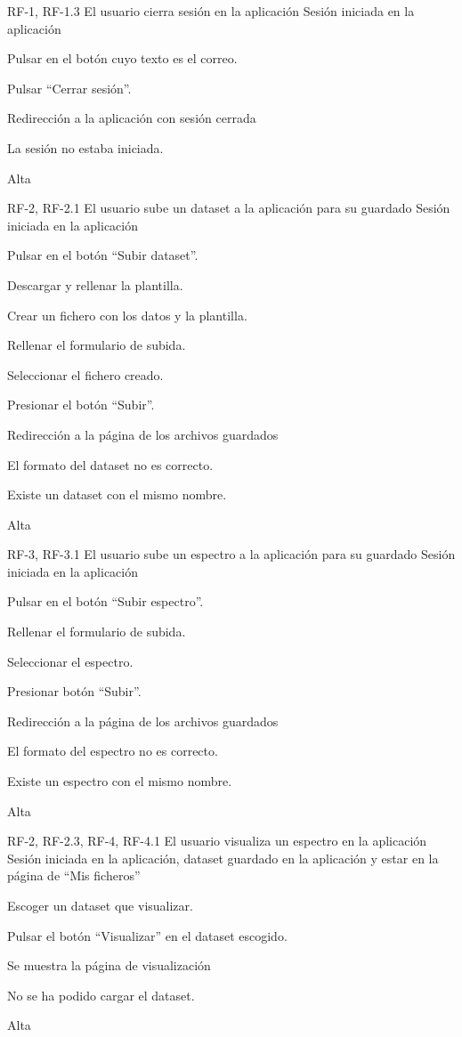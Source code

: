 {RF-1, RF-1.3}
{El usuario cierra sesión en la aplicación}
{Sesión iniciada en la aplicación}
{
	\item Pulsar en el botón cuyo texto es el correo.
	\item Pulsar ``Cerrar sesión''.
}
{Redirección a la aplicación con sesión cerrada}
{	\item La sesión no estaba iniciada.
}
{Alta}

{RF-2, RF-2.1}
{El usuario sube un dataset a la aplicación para su guardado}
{Sesión iniciada en la aplicación}
{
	\item Pulsar en el botón ``Subir dataset''.
	\item Descargar y rellenar la plantilla.
	\item Crear un fichero  con los datos y la plantilla.
	\item Rellenar el formulario de subida.
	\item Seleccionar el fichero creado.
	\item Presionar el botón ``Subir''.
}
{Redirección a la página de los archivos guardados}
{	\item El formato del dataset no es correcto.
	\item Existe un dataset con el mismo nombre.
}
{Alta}

{RF-3, RF-3.1}
{El usuario sube un espectro a la aplicación para su guardado}
{Sesión iniciada en la aplicación}
{
	\item Pulsar en el botón ``Subir espectro''.
	\item Rellenar el formulario de subida.
	\item Seleccionar el espectro.
	\item Presionar botón ``Subir''.
}
{Redirección a la página de los archivos guardados}
{	\item El formato del espectro no es correcto.
	\item Existe un espectro con el mismo nombre.
}
{Alta}

{RF-2, RF-2.3, RF-4, RF-4.1}
{El usuario visualiza un espectro en la aplicación}
{Sesión iniciada en la aplicación, dataset guardado en la aplicación y estar en 
la página de ``Mis ficheros''}
{
	\item Escoger un dataset que visualizar.
	\item Pulsar el botón ``Visualizar'' en el dataset escogido.
}
{Se muestra la página de visualización}
{	\item No se ha podido cargar el dataset.
}
{Alta}

